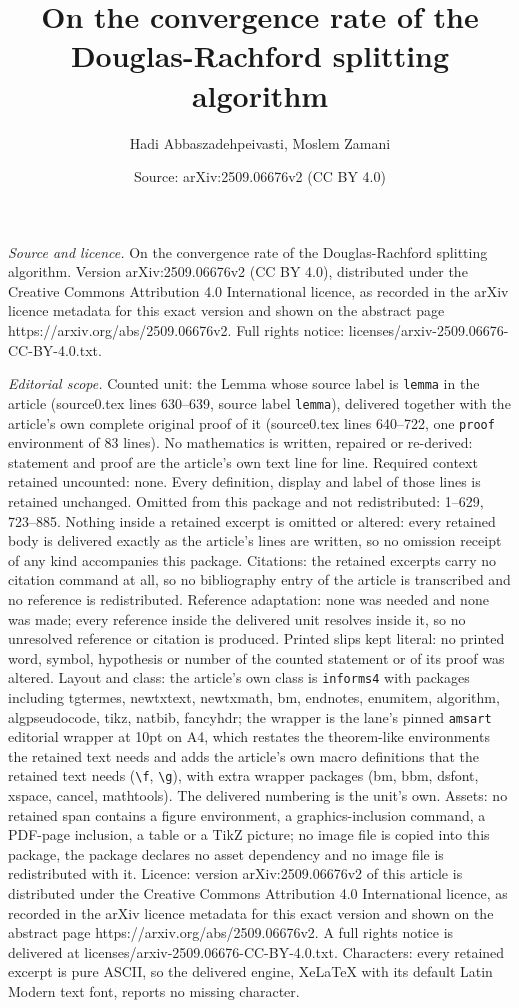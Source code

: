\documentclass[10pt,a4paper]{amsart}
\title[On the convergence rate of the Douglas-Rachford splitting al]{On the convergence rate of the Douglas-Rachford splitting algorithm}
\author{Hadi Abbaszadehpeivasti, Moslem Zamani}
\date{Source: arXiv:2509.06676v2 (CC BY 4.0)}
\begin{document}
\maketitle

\noindent\emph{Source and licence.} On the convergence rate of the Douglas-Rachford splitting algorithm. Version arXiv:2509.06676v2 (CC BY 4.0), distributed under the Creative Commons Attribution 4.0 International licence, as recorded in the arXiv licence metadata for this exact version and shown on the abstract page https://arxiv.org/abs/2509.06676v2. Full rights notice: licenses/arxiv-2509.06676-CC-BY-4.0.txt.\par\smallskip

\noindent\textit{Editorial scope.} Counted unit: the Lemma whose source label is \texttt{lemma} in the article (source0.tex lines 630--639, source label \texttt{lemma}), delivered together with the article's own complete original proof of it (source0.tex lines 640--722, one \texttt{proof} environment of 83 lines). No mathematics is written, repaired or re-derived: statement and proof are the article's own text line for line. Required context retained uncounted: none. Every definition, display and label of those lines is retained unchanged. Omitted from this package and not redistributed: 1--629, 723--885. Nothing inside a retained excerpt is omitted or altered: every retained body is delivered exactly as the article's lines are written, so no omission receipt of any kind accompanies this package. Citations: the retained excerpts carry no citation command at all, so no bibliography entry of the article is transcribed and no reference is redistributed. Reference adaptation: none was needed and none was made; every reference inside the delivered unit resolves inside it, so no unresolved reference or citation is produced. Printed slips kept literal: no printed word, symbol, hypothesis or number of the counted statement or of its proof was altered. Layout and class: the article's own class is \texttt{informs4} with packages including tgtermes, newtxtext, newtxmath, bm, endnotes, enumitem, algorithm, algpseudocode, tikz, natbib, fancyhdr; the wrapper is the lane's pinned \texttt{amsart} editorial wrapper at 10pt on A4, which restates the theorem-like environments the retained text needs and adds the article's own macro definitions that the retained text needs (\texttt{\textbackslash f}, \texttt{\textbackslash g}), with extra wrapper packages (bm, bbm, dsfont, xspace, cancel, mathtools). The delivered numbering is the unit's own. Assets: no retained span contains a figure environment, a graphics-inclusion command, a PDF-page inclusion, a table or a TikZ picture; no image file is copied into this package, the package declares no asset dependency and no image file is redistributed with it. Licence: version arXiv:2509.06676v2 of this article is distributed under the Creative Commons Attribution 4.0 International licence, as recorded in the arXiv licence metadata for this exact version and shown on the abstract page https://arxiv.org/abs/2509.06676v2. A full rights notice is delivered at licenses/arxiv-2509.06676-CC-BY-4.0.txt. Characters: every retained excerpt is pure ASCII, so the delivered engine, XeLaTeX with its default Latin Modern text font, reports no missing character.
\end{document}
